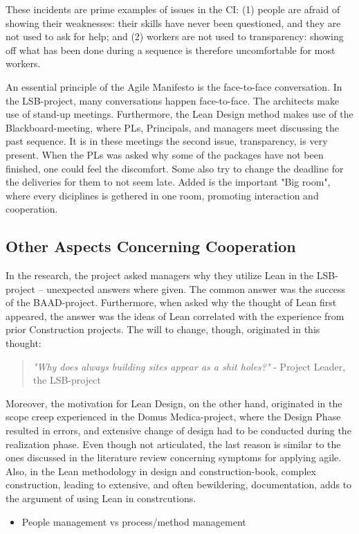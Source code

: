 These incidents are prime examples of issues in the CI: (1) people are afraid of showing their weaknesses: their skills have never been questioned, and they are not used to ask for help; and (2) workers are not used to transparency: showing off what has been done during a sequence is therefore uncomfortable for most workers. 

An essential principle of the Agile Manifesto is the face-to-face conversation. In the LSB-project, many conversations happen face-to-face. The architects make use of stand-up meetings. Furthermore, the Lean Design method makes use of the Blackboard-meeting, where PLs, Principals, and managers meet discussing the past sequence. It is in these meetings the second issue, transparency, is very present. When the PLs was asked why some of the packages have not been finished, one could feel the discomfort. Some also try to change the deadline for the deliveries for them to not seem late. Added is the important "Big room", where every diciplines is gethered in one room, promoting interaction and cooperation. 

\subsection{Other Aspects Concerning Cooperation}
In the research, the project asked managers why they utilize Lean in the LSB-project – unexpected answers where given. The common answer was the success of the BAAD-project. Furthermore, when asked why the thought of Lean first appeared, the answer was the ideas of Lean correlated with the experience from prior Construction projects. The will to change, though, originated in this thought: 
\begin{quote}
    \textit{"Why does always building sites appear as a shit holes?"} - Project Leader, the LSB-project
\end{quote}
Moreover, the motivation for Lean Design, on the other hand, originated in the scope creep experienced in the Domus Medica-project, where the Design Phase resulted in errors, and extensive change of design had to be conducted during the realization phase. Even though not articulated, the last reason is similar to the ones discussed in the literature review concerning symptoms for applying agile. Also, in the Lean methodology in design and construction-book, complex construction, leading to extensive, and often bewildering, documentation, adds to the argument of using Lean in constrcutions.  


\begin{itemize}
    \item People management vs process/method management
\end{itemize}


\cleardoublepage